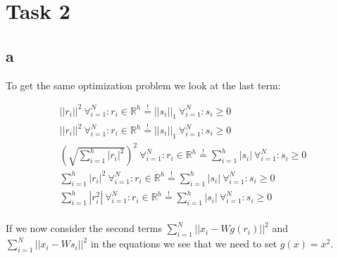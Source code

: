 \section*{Task 2}

\subsection*{a}

To get the same optimization problem we look at the last term:

\begin{gather*}
||r_i||^2 \ \forall^N_{i=1}: r_i\in\mathbb{R}^h \overset{!}{=} ||s_i||_1  \ \forall^N_{i=1}: s_i \geq 0\\
||r_i||^2 \ \forall^N_{i=1}: r_i\in\mathbb{R}^h \overset{!}{=} ||s_i||_1  \ \forall^N_{i=1}: s_i \geq 0\\
\left( \sqrt{\sum^h_{i=1} |r_i|^2} \right)^2 \ \forall^N_{i=1}: r_i\in\mathbb{R}^h \overset{!}{=} \sum^h_{i=1} |s_i| \ \forall^N_{i=1}: s_i \geq 0\\
\sum^h_{i=1} |r_i|^2 \ \forall^N_{i=1}: r_i\in\mathbb{R}^h \overset{!}{=} \sum^h_{i=1} |s_i| \ \forall^N_{i=1}: s_i \geq 0\\
\sum^h_{i=1} |r_i^2| \ \forall^N_{i=1}: r_i\in\mathbb{R}^h \overset{!}{=} \sum^h_{i=1} |s_i| \ \forall^N_{i=1}: s_i \geq 0\\
\end{gather*}

If we now consider the second terms $\sum^N_{i=1} ||x_i - W g(r_i)||^2$ and $\sum^N_{i=1} ||x_i - W s_i||^2 $ in the equations we see that we need to set $g(x) = x^2$.



